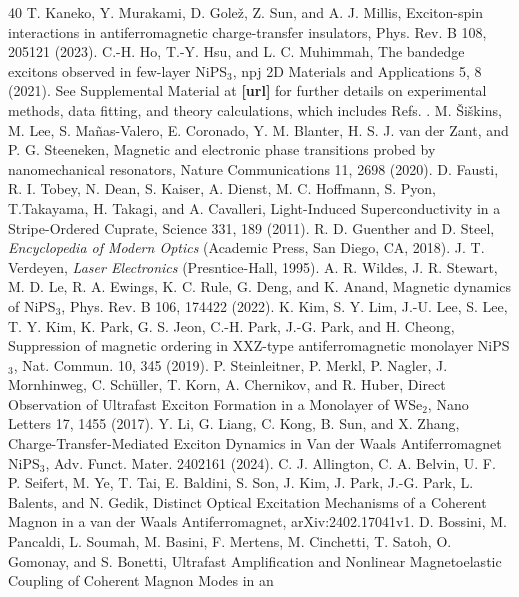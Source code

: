 \documentclass[
 reprint,
superscriptaddress,

 amsmath,amssymb,
 aps,

]{revtex4-2}
\begin{document}
\begin{thebibliography}{40}
T. Kaneko, Y. Murakami, D. Gole\v{z}, Z. Sun, and A. J.
Millis, Exciton-spin interactions in antiferromagnetic
charge-transfer insulators, Phys. Rev. B 108, 205121
(2023).
C.-H. Ho, T.-Y. Hsu, and L. C. Muhimmah, The bandedge
excitons observed in few-layer NiPS$_3$, npj 2D Materials
and Applications 5, 8 (2021).
See Supplemental Material at \textbf{[url]} for further details on experimental methods, data fitting, and theory calculations, which includes Refs. \cite{Siskins2022, Fausti2011, Guenther2018, Verdeyen1995, Wildes2022}.
M. \v{S}i\v{s}kins, M. Lee, S. Ma\~{n}as-Valero, E. Coronado, Y. M. Blanter, H. S. J. van der Zant, and P. G. Steeneken, Magnetic and electronic phase transitions probed by nanomechanical resonators, Nature Communications 11, 2698 (2020).
D. Fausti, R. I. Tobey, N. Dean, S. Kaiser, A. Dienst, M. C. Hoffmann, S. Pyon, T.Takayama, H. Takagi, and A. Cavalleri, Light-Induced Superconductivity in a Stripe-Ordered Cuprate, Science 331, 189 (2011).
R. D. Guenther and D. Steel, \textit{Encyclopedia of Modern Optics} (Academic Press, San Diego, CA, 2018).
J. T. Verdeyen, \textit{Laser Electronics} (Presntice-Hall, 1995).
A. R. Wildes, J. R. Stewart, M. D. Le, R. A. Ewings, K. C. Rule, G. Deng, and K. Anand, Magnetic dynamics of NiPS$_3$, Phys. Rev. B 106, 174422 (2022).
K. Kim, S. Y. Lim, J.-U. Lee, S. Lee, T. Y. Kim, K. Park,
G. S. Jeon, C.-H. Park, J.-G. Park, and H. Cheong, Suppression
of magnetic ordering in XXZ-type antiferromagnetic
monolayer NiPS$_3$, Nat. Commun. 10, 345 (2019).
P. Steinleitner, P. Merkl, P. Nagler, J. Mornhinweg,
C. Sch\"{u}ller, T. Korn, A. Chernikov, and R. Huber, Direct
Observation of Ultrafast Exciton Formation in a Monolayer
of WSe$_2$, Nano Letters 17, 1455 (2017).
Y. Li, G. Liang, C. Kong, B. Sun, and X. Zhang, Charge-Transfer-Mediated Exciton Dynamics in Van der Waals Antiferromagnet NiPS$_3$, Adv. Funct. Mater. 2402161
(2024).
C. J. Allington, C. A. Belvin, U. F. P. Seifert, M. Ye,
T. Tai, E. Baldini, S. Son, J. Kim, J. Park, J.-G. Park,
L. Balents, and N. Gedik, Distinct Optical Excitation
Mechanisms of a Coherent Magnon in a van der Waals
Antiferromagnet, arXiv:2402.17041v1.
D. Bossini, M. Pancaldi, L. Soumah, M. Basini,
F. Mertens, M. Cinchetti, T. Satoh, O. Gomonay, and
S. Bonetti, Ultrafast Amplification and Nonlinear Magnetoelastic
Coupling of Coherent Magnon Modes in an

\end{thebibliography}
\end{document}
